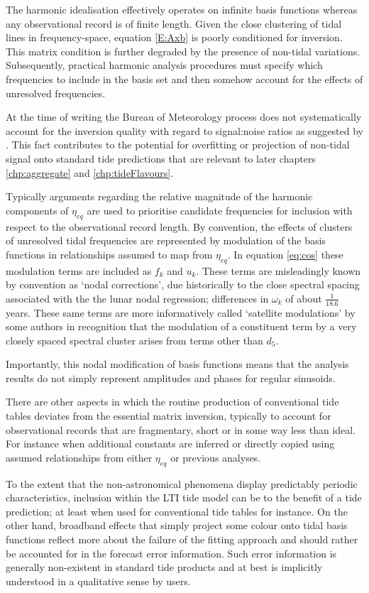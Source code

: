 The harmonic idealisation effectively operates on infinite basis functions whereas any observational record is of finite length.
Given the close clustering of tidal lines in frequency-space, equation \ref{E:Axb} is poorly conditioned for inversion.   This matrix condition is further degraded by the presence of non-tidal variations. 
Subsequently, practical harmonic analysis procedures must specify which frequencies to include in the basis set and then somehow account for the effects of unresolved frequencies.

At the time of writing the Bureau of Meteorology process does not systematically account for the inversion quality with regard to signal:noise ratios as suggested by \citet{Foreman:2009bg}.
This fact contributes to the potential for overfitting or projection of non-tidal signal onto standard tide predictions that are relevant to later chapters \ref{chp:aggregate} and \ref{chp:tideFlavours}.


Typically arguments regarding the relative magnitude of the harmonic components of $\eta_{eq}$ are used to prioritise candidate frequencies for inclusion with respect to the observational  record length. 
By convention, the effects of clusters of unresolved tidal frequencies are represented by modulation of the basis functions in relationships assumed to map from $\eta_{eq}$.  
In equation \ref{eq:cos} these modulation terms are included as $f_k$ and $u_k$.  These terms are misleadingly known by convention as `nodal corrections', due historically to the close spectral spacing associated with the the lunar nodal regression; differences in $\omega_k$ of about $\frac{1}{18.6}$ years.     These same terms are more informatively called `satellite modulations' by some authors in recognition that the modulation of a constituent term by a very closely spaced spectral cluster arises from terms other than $d_5$. 

Importantly, this nodal modification of basis functions means that the analysis results do not simply represent amplitudes and phases for regular sinusoids.  


There are other aspects in which the routine production of conventional tide tables deviates from the essential matrix inversion, typically to account for observational records that are fragmentary, short or in some way less than ideal.
For instance when additional constants are inferred or directly copied using assumed relationships from either $\eta_{eq}$ or previous analyses.  


To the extent that the non-astronomical phenomena display predictably periodic characteristics, inclusion within the LTI tide model can be to the benefit of a tide prediction; at least when used for conventional tide tables for instance.   
On the other hand, broadband effects that simply project some colour onto tidal basis functions reflect more about the failure of the fitting approach and should rather be accounted for in the forecast error information. Such error information is generally non-existent in standard tide products and at best is implicitly understood in a qualitative sense by users. 

